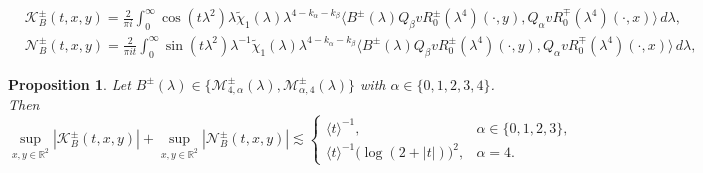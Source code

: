 \documentclass[10pt,a4paper]{amsart}
\newtheorem{proposition}{Proposition}
\begin{document}
\begin{align}
	\label{K_1}
	& \mathcal{K}_{B}^\pm(t,x,y)=\frac{2}{\pi i}\int_0^{\infty} \cos(t \lambda^2)\lambda \widetilde{\chi}_1(\lambda) \lambda^{4-k_\alpha-k_\beta}\bigl\langle  B^\pm(\lambda)Q_\beta vR_0^\pm(\lambda^{4})(\cdot,y), Q_\alpha vR_0^\mp(\lambda^{4})(\cdot,x)\bigr\rangle \, d \lambda, \\
	\label{Lambda_1}
	& \mathcal{N}_{B}^\pm(t,x,y)=\frac{2}{\pi it}\int_0^{\infty} \sin(t\lambda^2)\lambda^{-1}\widetilde{\chi}_1(\lambda)\lambda^{4-k_\alpha-k_\beta}
	\bigl\langle  B^\pm(\lambda)Q_\beta vR_0^\pm(\lambda^{4})(\cdot,y), Q_\alpha vR_0^\mp(\lambda^{4})(\cdot,x)\bigr\rangle \, d \lambda,
\end{align}

\begin{proposition}\label{prop_second_2_3}
	Let $B^\pm(\lambda) \in \{\mathcal{M}_{4,\alpha}^{\pm}(\lambda), \mathcal{M}_{\alpha,4}^{\pm}(\lambda)\}$ with $\alpha \in \{0,1,2,3,4\}$. Then
	\[  
\sup _{x, y \in \mathbb{R}^2}\left| \mathcal{K}_{B}^\pm(t,x,y)\right| + \sup _{x, y \in \mathbb{R}^2}\left|\mathcal{N}_{B}^\pm (t,x,y)\right| \lesssim
	\begin{cases}
	\langle t\rangle^{-1}, & \alpha\in\{0,1,2,3\},\\
	\langle t\rangle^{-1}\bigl(\log(2+|t|)\bigr)^2, & {\alpha} = 4.
\end{cases}  
	\]  
\end{proposition}
\end{document}
